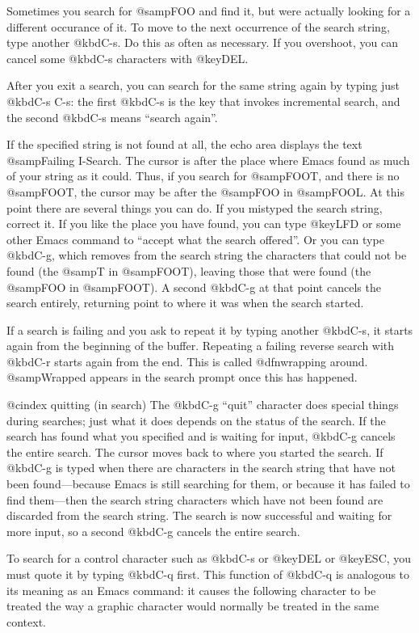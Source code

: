 {{{{  Sometimes you search for @samp{FOO} and find it, but were actually
looking for a different occurance of it.  To move to the next occurrence
of the search string, type another @kbd{C-s}.  Do this as often as
necessary.  If you overshoot, you can cancel some @kbd{C-s}
characters with @key{DEL}.

  After you exit a search, you can search for the same string again by
typing just @kbd{C-s C-s}: the first @kbd{C-s} is the key that invokes
incremental search, and the second @kbd{C-s} means ``search again''.

  If the specified string is not found at all, the echo area displays
the text @samp{Failing I-Search}.  The cursor is after the place where
Emacs found as much of your string as it could.  Thus, if you search for
@samp{FOOT}, and there is no @samp{FOOT}, the cursor may be after the
@samp{FOO} in @samp{FOOL}.  At this point there are several things you
can do.  If you mistyped the search string, correct it.  If you like the
place you have found, you can type @key{LFD} or some other Emacs command
to ``accept what the search offered''.  Or you can type @kbd{C-g}, which
removes from the search string the characters that could not be found
(the @samp{T} in @samp{FOOT}), leaving those that were found (the
@samp{FOO} in @samp{FOOT}).  A second @kbd{C-g} at that point cancels
the search entirely, returning point to where it was when the search
started.

  If a search is failing and you ask to repeat it by typing another
@kbd{C-s}, it starts again from the beginning of the buffer.  Repeating
a failing reverse search with @kbd{C-r} starts again from the end.  This
is called @dfn{wrapping around}.  @samp{Wrapped} appears in the search
prompt once this has happened.

@cindex quitting (in search)
  The @kbd{C-g} ``quit'' character does special things during searches;
just what it does depends on the status of the search.  If the search has
found what you specified and is waiting for input, @kbd{C-g} cancels the
entire search.  The cursor moves back to where you started the search.  If
@kbd{C-g} is typed when there are characters in the search string that have
not been found---because Emacs is still searching for them, or because it
has failed to find them---then the search string characters which have not
been found are discarded from the search string.  The
search is now successful and waiting for more input, so a second @kbd{C-g}
cancels the entire search.

  To search for a control character such as @kbd{C-s} or @key{DEL} or
@key{ESC}, you must quote it by typing @kbd{C-q} first.  This function
of @kbd{C-q} is analogous to its meaning as an Emacs command: it causes
the following character to be treated the way a graphic character would
normally be treated in the same context.

}}}}
